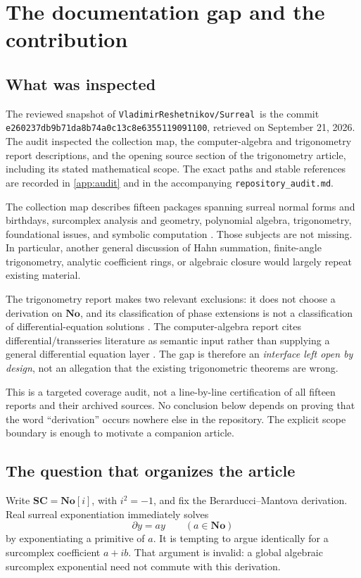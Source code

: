 \documentclass[11pt,letterpaper]{article}
\numberwithin{equation}{section}
\theoremstyle{definition}
\theoremstyle{remark}
\newcommand{\No}{\mathbf{No}}
\newcommand{\SC}{\mathbf{SC}}
\newcommand{\der}{\partial}
\newcommand{\Repo}{\texttt{VladimirReshetnikov/Surreal}}
\newcommand{\Commit}{\nolinkurl{e260237db9b71da8b74a0c13c8e6355119091100}}
\begin{document}
\section{The documentation gap and the contribution}\label{sec:gap}

\subsection{What was inspected}
The reviewed snapshot of \Repo\ is the commit \Commit, retrieved on September 21, 2026. The audit inspected the collection map, the computer-algebra and trigonometry report descriptions, and the opening source section of the trigonometry article, including its stated mathematical scope. The exact paths and stable references are recorded in \cref{app:audit} and in the accompanying \texttt{repository\_audit.md}.

The collection map describes fifteen packages spanning surreal normal forms and birthdays, surcomplex analysis and geometry, polynomial algebra, trigonometry, foundational issues, and symbolic computation \cite{RepoMap}. Those subjects are not missing. In particular, another general discussion of Hahn summation, finite-angle trigonometry, analytic coefficient rings, or algebraic closure would largely repeat existing material.

The trigonometry report makes two relevant exclusions: it does not choose a derivation on $\No$, and its classification of phase extensions is not a classification of differential-equation solutions \cite{RepoTrig}. The computer-algebra report cites differential/transseries literature as semantic input rather than supplying a general differential equation layer \cite{RepoCAS}. The gap is therefore an \emph{interface left open by design}, not an allegation that the existing trigonometric theorems are wrong.

This is a targeted coverage audit, not a line-by-line certification of all fifteen reports and their archived sources. No conclusion below depends on proving that the word ``derivation'' occurs nowhere else in the repository. The explicit scope boundary is enough to motivate a companion article.

\subsection{The question that organizes the article}
Write $\SC=\No[i]$, with $i^2=-1$, and fix the Berarducci--Mantova derivation. Real surreal exponentiation immediately solves
\[
 \der y=a y\qquad(a\in\No)
\]
by exponentiating a primitive of $a$. It is tempting to argue identically for a surcomplex coefficient $a+ib$. That argument is invalid: a global algebraic surcomplex exponential need not commute with this derivation.
\end{document}
